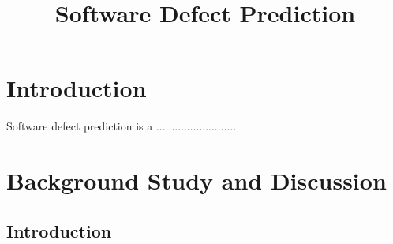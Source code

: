 \documentclass[12pt]{report}
\begin{document}
\doublespacing
\title{ Software Defect Prediction}
\date{}
\maketitle







%
%
%
%
%
%
%
\chapter{Introduction}
Software defect prediction is a ..........................
\chapter{Background Study and Discussion}
\section{Introduction}
\end{document}
